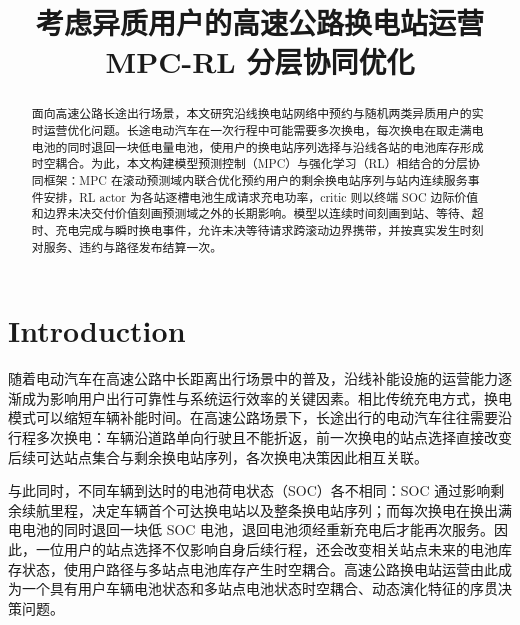 \documentclass[12pt,a4paper,UTF8]{ctexart}
\begin{document}
\cover

\newpage
\begin{abstract}

面向高速公路长途出行场景，本文研究沿线换电站网络中预约与随机两类异质用户的实时运营优化问题。长途电动汽车在一次行程中可能需要多次换电，每次换电在取走满电电池的同时退回一块低电量电池，使用户的换电站序列选择与沿线各站的电池库存形成时空耦合。为此，本文构建模型预测控制（MPC）与强化学习（RL）相结合的分层协同框架：MPC 在滚动预测域内联合优化预约用户的剩余换电站序列与站内连续服务事件安排，RL actor 为各站逐槽电池生成请求充电功率，critic 则以终端 SOC 边际价值和边界未决交付价值刻画预测域之外的长期影响。模型以连续时间刻画到站、等待、超时、充电完成与瞬时换电事件，允许未决等待请求跨滚动边界携带，并按真实发生时刻对服务、违约与路径发布结算一次。

\end{abstract}
\newpage

\thispagestyle{empty} %

\newpage
\tableofcontents

\newpage

\begin{center}
   \title{ \Huge \textbf{{考虑异质用户的高速公路换电站运营 MPC-RL 分层协同优化}}}
\end{center}


\section{Introduction}
随着电动汽车在高速公路中长距离出行场景中的普及，沿线补能设施的运营能力逐渐成为影响用户出行可靠性与系统运行效率的关键因素。相比传统充电方式，换电模式可以缩短车辆补能时间。在高速公路场景下，长途出行的电动汽车往往需要沿行程多次换电：车辆沿道路单向行驶且不能折返，前一次换电的站点选择直接改变后续可达站点集合与剩余换电站序列，各次换电决策因此相互关联。

与此同时，不同车辆到达时的电池荷电状态（SOC）各不相同：SOC 通过影响剩余续航里程，决定车辆首个可达换电站以及整条换电站序列；而每次换电在换出满电电池的同时退回一块低 SOC 电池，退回电池须经重新充电后才能再次服务。因此，一位用户的站点选择不仅影响自身后续行程，还会改变相关站点未来的电池库存状态，使用户路径与多站点电池库存产生时空耦合。高速公路换电站运营由此成为一个具有用户车辆电池状态和多站点电池状态时空耦合、动态演化特征的序贯决策问题。
\end{document}
